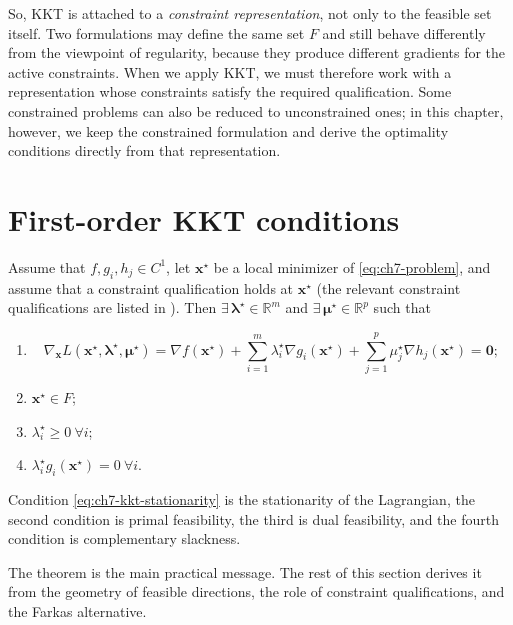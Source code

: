 So, KKT is attached to a
\emph{constraint representation}, not only to the feasible set itself. Two
formulations may define the same set $F$ and still behave differently from the
viewpoint of regularity, because they produce different gradients for the
active constraints. When we apply KKT, we must therefore work with a
representation whose constraints satisfy the required qualification. Some
constrained problems can also be reduced to unconstrained ones; in this
chapter, however, we keep the constrained formulation and derive the optimality
conditions directly from that representation.

\section{First-order KKT conditions}
\label{sec:ch7-kkt-first-order}
\begin{theorem}
\label{thm:ch7-kkt-first}
Assume that $f,g_i,h_j\in C^1$, let $\mathbf{x}^\star$ be a local minimizer of
\eqref{eq:ch7-problem}, and assume that a constraint qualification holds at
$\mathbf{x}^\star$ (the relevant constraint qualifications are listed in
). Then \(\exists\, \boldsymbol{\lambda}^\star \in \mathbb{R}^m\)
and \(\exists\, \boldsymbol{\mu}^\star \in \mathbb{R}^p\) such that
\begin{enumerate}
  \item
  \begin{equation}
    \label{eq:ch7-kkt-stationarity}
    \nabla_{\mathbf{x}} L(\mathbf{x}^\star,\boldsymbol{\lambda}^\star,\boldsymbol{\mu}^\star)
    =
    \nabla f(\mathbf{x}^\star)
    + \sum_{i=1}^m \lambda_i^\star \nabla g_i(\mathbf{x}^\star)
    + \sum_{j=1}^p \mu_j^\star \nabla h_j(\mathbf{x}^\star)
    = \mathbf{0};
  \end{equation}
  \item $\mathbf{x}^\star \in F$;
  \item $\lambda_i^\star \ge 0 \ \forall i$;
  \item $\lambda_i^\star g_i(\mathbf{x}^\star)=0 \ \forall i$.
\end{enumerate}
Condition \eqref{eq:ch7-kkt-stationarity} is the stationarity of the
Lagrangian, the second condition is primal feasibility, the third is dual
feasibility, and the fourth condition is complementary slackness.
\end{theorem}

The theorem is the main practical message. The rest of this section derives it
from the geometry of feasible directions, the role of constraint qualifications,
and the Farkas alternative.

